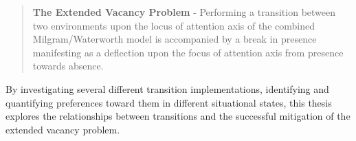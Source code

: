 \begin{quote}
	\textbf{The Extended Vacancy Problem} - Performing a transition between two environments upon the locus of attention axis of the combined Milgram/Waterworth model is accompanied by a break in presence manifesting as a deflection upon the focus of attention axis from presence towards absence.
\end{quote}

By investigating several different transition implementations, identifying and quantifying preferences toward them in different situational states, this thesis explores the relationships between transitions and the successful mitigation of the extended vacancy problem.
















